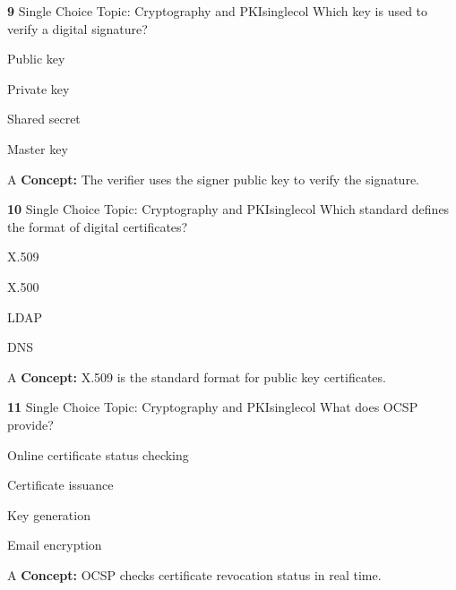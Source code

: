 \documentclass[10pt,a4paper]{article}
\begin{document}
\begin{qcard}{\color{white}\textbf{9} \hfill \small Single Choice \textbar{} Topic: Cryptography and PKI}{singlecol}
Which key is used to verify a digital signature?

\begin{qoptions}
\item Public key
\item Private key
\item Shared secret
\item Master key
\end{qoptions}
\begin{explainbox}{A}
\textbf{Concept:} The verifier uses the signer public key to verify the signature.
\end{explainbox}
\end{qcard}

\begin{qcard}{\color{white}\textbf{10} \hfill \small Single Choice \textbar{} Topic: Cryptography and PKI}{singlecol}
Which standard defines the format of digital certificates?

\begin{qoptions}
\item X.509
\item X.500
\item LDAP
\item DNS
\end{qoptions}
\begin{explainbox}{A}
\textbf{Concept:} X.509 is the standard format for public key certificates.
\end{explainbox}
\end{qcard}

\begin{qcard}{\color{white}\textbf{11} \hfill \small Single Choice \textbar{} Topic: Cryptography and PKI}{singlecol}
What does OCSP provide?

\begin{qoptions}
\item Online certificate status checking
\item Certificate issuance
\item Key generation
\item Email encryption
\end{qoptions}
\begin{explainbox}{A}
\textbf{Concept:} OCSP checks certificate revocation status in real time.
\end{explainbox}
\end{qcard}
\end{document}
